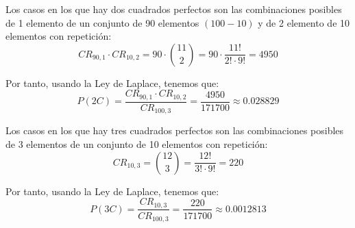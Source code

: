 \begin{ejercicio}
\begin{enumerate}
\begin{itemize}
            Los casos en los que hay dos cuadrados perfectos son las combinaciones posibles de 1 elemento de un conjunto de 90 elementos $(100-10)$ y de 2 elemento de 10 elementos con repetición:
            \begin{equation*}
                CR_{90,1}\cdot CR_{10,2}=90\cdot \binom{11}{2}=90\cdot \frac{11!}{2!\cdot 9!} = 4950
            \end{equation*}

            Por tanto, usando la Ley de Laplace, tenemos que:
            \begin{equation*}
                P(2C)=\frac{CR_{90,1}\cdot CR_{10,2}}{CR_{100,3}} = \frac{4950}{171700} \approx 0.028829
            \end{equation*}


            Los casos en los que hay tres cuadrados perfectos son las combinaciones posibles de 3 elementos de un conjunto de 10 elementos con repetición:
            \begin{equation*}
                CR_{10,3}=\binom{12}{3}=\frac{12!}{3!\cdot 9!} = 220
            \end{equation*}

            Por tanto, usando la Ley de Laplace, tenemos que:
            \begin{equation*}
                P(3C)=\frac{CR_{10,3}}{CR_{100,3}} = \frac{220}{171700} \approx 0.0012813
            \end{equation*}
        \end{itemize}
        
    \end{enumerate}
\end{ejercicio}

